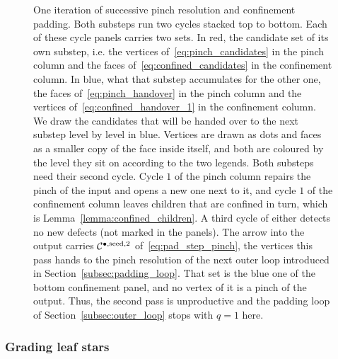 \documentclass[a4paper, 12pt]{article}
\makeatletter
\DeclareRobustCommand{\candV}[1][]{\mathcal{C}^{\bullet\ifx\@empty#1\@empty\else,#1\fi}}
\theoremstyle{definition}
\theoremstyle{plain}
\numberwithin{equation}{section}
\makeatother
\begin{document}
\begin{figure}[!tb]

    \caption{One iteration of successive pinch resolution and confinement padding. Both substeps run two cycles stacked top to bottom. Each of these cycle panels carries two sets. In red, the candidate set of its own substep, i.e. the vertices of~\eqref{eq:pinch_candidates} in the pinch column and the faces of~\eqref{eq:confined_candidates} in the confinement column. In blue, what that substep accumulates for the other one, the faces of~\eqref{eq:pinch_handover} in the pinch column and the vertices of~\eqref{eq:confined_handover_1} in the confinement column. We draw the candidates that will be handed over to the next substep level by level in blue. Vertices are drawn as dots and faces as a smaller copy of the face inside itself, and both are coloured by the level they sit on according to the two legends. Both substeps need their second cycle. Cycle $1$ of the pinch column repairs the pinch of the input and opens a new one next to it, and cycle $1$ of the confinement column leaves children that are confined in turn, which is Lemma~\ref{lemma:confined_children}. A third cycle of either detects no new defects (not marked in the panels). The arrow into the output carries $\candV[\mathrm{seed},2]$ of~\eqref{eq:pad_step_pinch}, the vertices this pass hands to the pinch resolution of the next outer loop introduced in Section~\ref{subsec:padding_loop}. That set is the blue one of the bottom confinement panel, and no vertex of it is a pinch of the output. Thus, the second pass is unproductive and the padding loop of Section~\ref{subsec:outer_loop} stops with $q = 1$ here.}
    \label{fig:candidate_sets}
\end{figure}

\FloatBarrier

\subsubsection{Grading leaf stars}
\label{subsubsec:grading}
\end{document}
